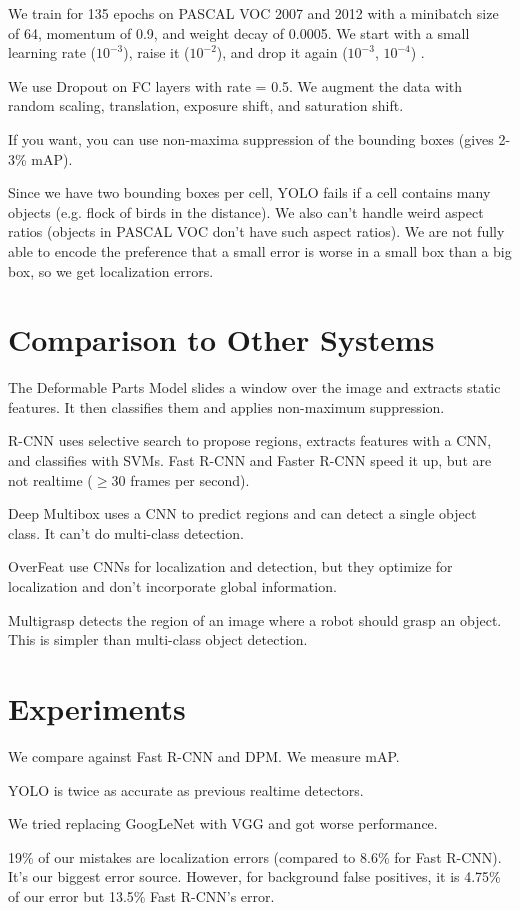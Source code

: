 \documentclass[a4paper]{article}
\begin{document}
We train for 135 epochs on PASCAL VOC 2007 and 2012 with a minibatch size of
64, momentum of 0.9, and weight decay of 0.0005. We start with a small learning
rate ($10^{-3}$), raise it ($10^{-2}$), and drop it again ($10^{-3}$, $10^{-4}$)
.

We use Dropout on FC layers with rate = 0.5. We augment the data with random
scaling, translation, exposure shift, and saturation shift.

If you want, you can use non-maxima suppression of the bounding boxes (gives 2-
3\% mAP).

Since we have two bounding boxes per cell, YOLO fails if a cell contains many
objects (e.g. flock of birds in the distance). We also can't handle weird
aspect ratios (objects in PASCAL VOC don't have such aspect ratios). We are not
fully able to encode the preference that a small error is worse in a small box
than a big box, so we get localization errors.

\section{Comparison to Other Systems}
The Deformable Parts Model slides a window over the image and extracts static
features. It then classifies them and applies non-maximum suppression.

R-CNN uses selective search to propose regions, extracts features with a CNN,
and classifies with SVMs. Fast R-CNN and Faster R-CNN speed it up, but are not
realtime ($\geq 30$ frames per second).

Deep Multibox uses a CNN to predict regions and can detect a single object class.
It can't do multi-class detection.

OverFeat use CNNs for localization and detection, but they optimize for
localization and don't incorporate global information.

Multigrasp detects the region of an image where a robot should grasp an object.
This is simpler than multi-class object detection.

\section{Experiments}
We compare against Fast R-CNN and DPM. We measure mAP.

YOLO is twice as accurate as previous realtime detectors.

We tried replacing GoogLeNet with VGG and got worse performance.

19\% of our mistakes are localization errors (compared to 8.6\% for Fast
R-CNN). It's our biggest error source. However, for background false positives,
it is 4.75\% of our error but 13.5\% Fast R-CNN's error.
\end{document}
